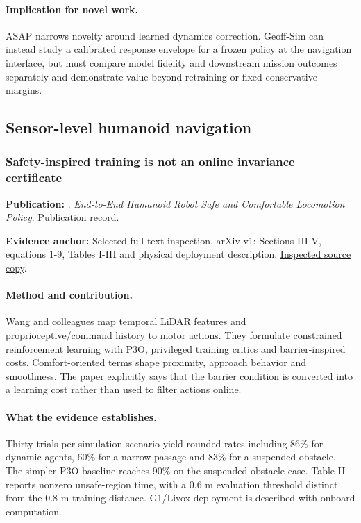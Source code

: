 \paragraph{Implication for novel work.} ASAP narrows novelty around learned dynamics correction. Geoff-Sim can instead study a calibrated response envelope for a frozen policy at the navigation interface, but must compare model fidelity and downstream mission outcomes separately and demonstrate value beyond retraining or fixed conservative margins.

\subsection{Sensor-level humanoid navigation}
\subsubsection{Safety-inspired training is not an online invariance certificate}\label{paper:safehumanoid}
\textbf{Publication:} \citet{safehumanoid}. \emph{End-to-End Humanoid Robot Safe and Comfortable Locomotion Policy}. \href{https://arxiv.org/abs/2508.07611v1}{Publication record}.

\textbf{Evidence anchor:} Selected full-text inspection. arXiv v1: Sections III-V, equations 1-9, Tables I-III and physical deployment description. \href{https://arxiv.org/pdf/2508.07611v1}{Inspected source copy}.

\paragraph{Method and contribution.} Wang and colleagues map temporal LiDAR features and proprioceptive/command history to motor actions. They formulate constrained reinforcement learning with P3O, privileged training critics and barrier-inspired costs. Comfort-oriented terms shape proximity, approach behavior and smoothness. The paper explicitly says that the barrier condition is converted into a learning cost rather than used to filter actions online.

\paragraph{What the evidence establishes.} Thirty trials per simulation scenario yield rounded rates including 86\% for dynamic agents, 60\% for a narrow passage and 83\% for a suspended obstacle. The simpler P3O baseline reaches 90\% on the suspended-obstacle case. Table II reports nonzero unsafe-region time, with a 0.6 m evaluation threshold distinct from the 0.8 m training distance. G1/Livox deployment is described with onboard computation.

